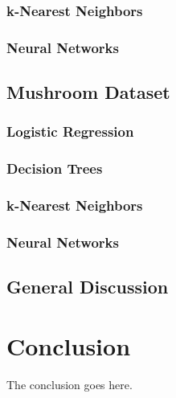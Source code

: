 \documentclass[conference]{IEEEtran}
\begin{document}
\subsubsection{k-Nearest Neighbors}
\subsubsection{Neural Networks}

\subsection{Mushroom Dataset}
\subsubsection{Logistic Regression}
\subsubsection{Decision Trees}
\subsubsection{k-Nearest Neighbors}
\subsubsection{Neural Networks}

\subsection{General Discussion}

\section{Conclusion}
The conclusion goes here.

\nocite{*}
\def\BibTeX{BibTeX}


\end{document}
